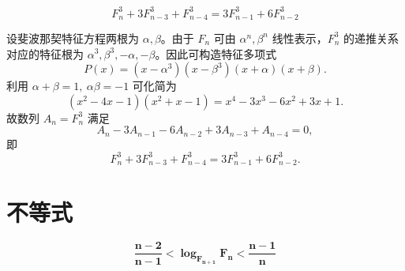 \begin{conclusion}
    \[F_n^3 + 3 F_{n-3}^3 + F_{n-4}^3 = 3 F_{n-1}^3 + 6 F_{n-2}^3\]
\end{conclusion}
设斐波那契特征方程两根为 \(\alpha,\beta\)。由于 \(F_n\) 可由 \(\alpha^n,\beta^n\) 线性表示，\(F_n^3\) 的递推关系对应的特征根为 \(\alpha^3,\beta^3,-\alpha,-\beta\)。因此可构造特征多项式
\[
P(x) = (x-\alpha^3)(x-\beta^3)(x+\alpha)(x+\beta).
\]
利用 \(\alpha+\beta=1,\ \alpha\beta=-1\) 可化简为
\[
(x^2 - 4x - 1)(x^2 + x - 1) = x^4 - 3x^3 - 6x^2 + 3x + 1.
\]
故数列 \(A_n=F_n^3\) 满足
\[
A_n - 3A_{n-1} - 6A_{n-2} + 3A_{n-3} + A_{n-4} = 0,
\]
即
\[
F_n^3 + 3F_{n-3}^3 + F_{n-4}^3 = 3F_{n-1}^3 + 6F_{n-2}^3.
\]

\section{不等式}
$$ \mathbf{\frac{n-2}{n-1} < \log_{F_{n+1}} F_n < \frac{n-1}{n}} $$

